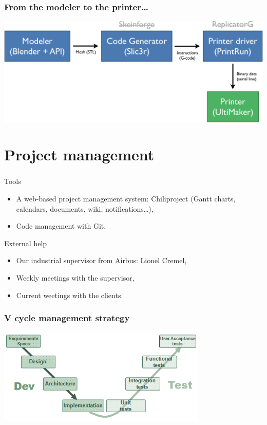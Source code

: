 \documentclass{beamer}
\begin{document}
\begin{frame}
	\frametitle{From the modeler to the printer…}

    \begin{center}
		\includegraphics[width=\textwidth]{schema}
	\end{center}
	
\end{frame}

\section{Project management}

\begin{frame}
	\frametitle{}
	\begin{block}{Tools}
    \begin{itemize}
		\item A web-based project management system: Chiliproject (Gantt charts, calendars, documents, wiki, notifications\ldots ),
		\item Code management with Git.
	\end{itemize}
	\end{block}
	
	\begin{block}{External help}
    \begin{itemize}
		\item Our industrial supervisor from Airbus: Lionel Cremel,
		\item Weekly meetings with the supervisor, 
		\item Current weetings with the clients.
	\end{itemize}
	\end{block}
\end{frame}

\begin{frame}
	\frametitle{V cycle management strategy}
	\begin{center}
		\includegraphics[width=10cm]{VCycle}	
	\end{center}
    
\end{frame}
\end{document}
